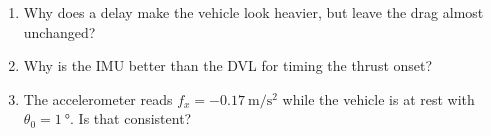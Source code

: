 \begin{questions}
\begin{enumerate}
  \item Why does a delay make the vehicle look heavier, but leave the drag almost unchanged?
  \item Why is the IMU better than the DVL for timing the thrust onset?
  \item The accelerometer reads $f_x = \qty{-0.17}{\meter\per\second\squared}$ while the vehicle
        is at rest with $\theta_0 = \qty{1}{\degree}$. Is that consistent?
\end{enumerate}
\end{questions}
